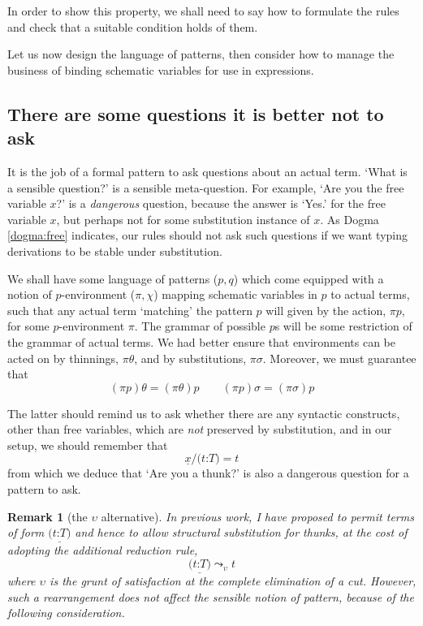 \documentclass{jfp1}
\newtheorem{remark}[theorem]{Remark}
\newcommand{\fsl}{\texttt{/}}
\newcommand{\Pa}[1]{\texttt{(}#1\texttt{)}}
\newcommand{\hb}{\texttt{:}}
\newcommand{\ra}[2]{\Pa{#1 \hb #2}}
\newcommand{\Ne}{\underline}
\begin{document}
In order to show this property, we shall need to say how to formulate
the rules and check that a suitable condition holds of them.

Let us now design the language of patterns, then consider how to
manage the business of binding schematic variables for use in
expressions.


\subsection{There are some questions it is better not to ask}

It is the job of a formal pattern to ask questions about an actual
term. `What is a sensible question?' is a sensible meta-question.
For example, `Are you the free variable $x$?' is a \emph{dangerous}
question, because the answer is `Yes.' for the free variable $x$, but
perhaps not for some substitution instance of $x$. As Dogma
\ref{dogma:free} indicates, our rules should not ask such questions if
we want typing derivations to be stable under substitution.

We shall have some language of patterns ($p,q$) which come equipped with a
notion of $p$-environment ($\pi,\chi$) mapping schematic variables in
$p$ to actual terms, such that any actual term `matching' the pattern
$p$ will given by the action, $\pi p$, for some $p$-environment $\pi$. The grammar of
possible $p$s will be some restriction of the grammar of actual terms.
We had better ensure that environments can be acted on by thinnings,
$\pi\theta$, and by substitutions, $\pi\sigma$. Moreover, we must
guarantee that
\[
  (\pi p)\theta = (\pi\theta)p\qquad
  (\pi p)\sigma = (\pi\sigma)p
\]

The latter should remind us to ask whether there are any syntactic
constructs, other than free variables, which are \emph{not} preserved
by substitution, and in our setup, we should remember that
\[
  \Ne x\fsl\ra tT = t
\]
from which we deduce that `Are you a thunk?' is also a dangerous
question for a pattern to ask.

\begin{remark}[the $\upsilon$ alternative]
  In previous work, I have proposed to permit terms of form $\Ne{\ra
    tT}$ and hence to allow structural substitution for thunks, at the
  cost of adopting the additional reduction rule,
  \[
    \Ne{\ra tT} \leadsto_\upsilon t
  \]
  where $\upsilon$ is the grunt of satisfaction at the complete
  elimination of a cut. However, such a rearrangement does not
  affect the sensible notion of pattern, because of the following
  consideration.
\end{remark}
\end{document}
